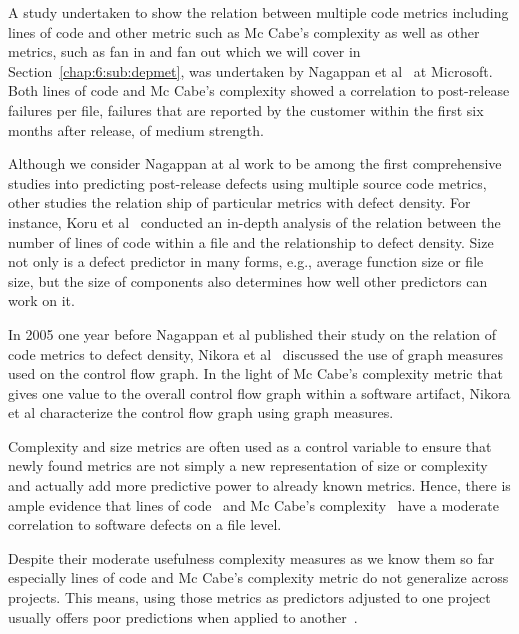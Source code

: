 A study undertaken to show the relation between multiple code metrics including lines of code and other metric such as Mc Cabe's complexity as well as other metrics, such as fan in and fan out which we will cover in Section~\ref{chap:6:sub:depmet}, was undertaken by Nagappan et al~\cite{nagappan:icse:2006} at Microsoft.
Both lines of code and Mc Cabe's complexity showed a correlation to post-release failures per file, failures that are reported by the customer within the first six months after release, of medium strength.

Although we consider Nagappan at al work to be among the first comprehensive studies into predicting post-release defects using multiple source code metrics, other studies the relation ship of particular metrics with defect density.
For instance, Koru et al~\cite{koru:promise:2005} conducted an in-depth analysis of the relation between the number of lines of code within a file and the relationship to defect density.
Size not only is a defect predictor in many forms, e.g., average function size or file size, but the size of components also determines how well other predictors can work on it.

In 2005 one year before Nagappan et al published their study on the relation of code metrics to defect density, Nikora et al~\cite{nikora:metrics:2005} discussed the use of graph measures used on the control flow graph.
In the light of Mc Cabe's complexity metric that gives one value to the overall control flow graph within a software artifact, Nikora et al characterize the control flow graph using graph measures.

Complexity and size metrics are often used as a control variable to ensure that newly found metrics are not simply a new representation of size or complexity and actually add more predictive power to already known metrics.
Hence, there is ample evidence that lines of code~\cite{shihab:esem:2010,arisholm:isese:2006,jiang:promise:2008,knab:msr:2006,zhang:icsm:2009} and Mc Cabe's complexity~\cite{nagappan:icse:2006,shihab:fse:2011,zimmermann:fse:2009,jiang:promise:2008,zimmermann:promise:2007} have a moderate correlation to software defects on a file level.

Despite their moderate usefulness complexity measures as we know them so far especially lines of code and Mc Cabe's complexity metric do not generalize across projects.
This means, using those metrics as predictors adjusted to one project usually offers poor predictions when applied to another~\cite{zimmermann:fse:2009}. 


